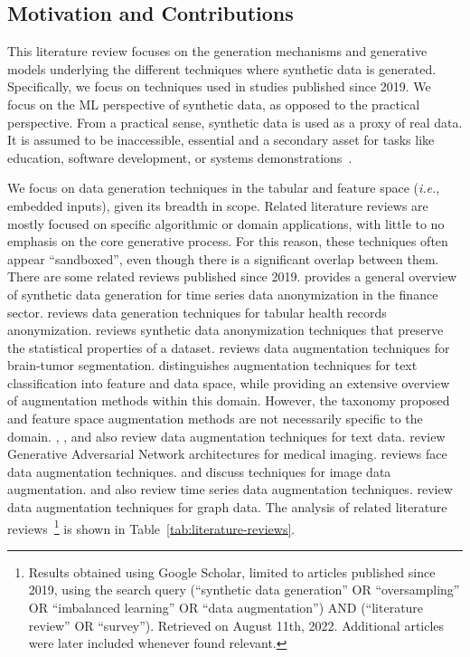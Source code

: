 \documentclass[parskip=full]{scrartcl}
\begin{document}

\subsection{Motivation and Contributions}

This literature review focuses on the generation mechanisms and generative
models underlying the different techniques where synthetic data is generated.
Specifically, we focus on techniques used in studies published since 2019. We
focus on the ML perspective of synthetic data, as opposed to the practical
perspective. From a practical sense, synthetic data is used as a proxy of real
data. It is assumed to be inaccessible, essential and a secondary asset for
tasks like education, software development, or systems
demonstrations~\cite{mannino2019real}. 

We focus on data generation techniques in the tabular and feature space
(\textit{i.e.}, embedded inputs), given its breadth in scope. Related
literature reviews are mostly focused on specific algorithmic or domain
applications, with little to no emphasis on the core generative process. For
this reason, these techniques often appear ``sandboxed'', even though there is
a significant overlap between them. There are some related reviews published
since 2019. \citet{assefa2020generating} provides a general overview of
synthetic data generation for time series data anonymization in the finance
sector. \citet{hernandez2022synthetic} reviews data generation techniques for
tabular health records anonymization. \citet{raghunathan2021synthetic} reviews
synthetic data anonymization techniques that preserve the statistical
properties of a dataset. \citet{nalepa2019data} reviews data augmentation
techniques for brain-tumor segmentation. \citet{bayer2021survey} distinguishes
augmentation techniques for text classification into feature and data space,
while providing an extensive overview of augmentation methods within this
domain. However, the taxonomy proposed and feature space augmentation methods
are not necessarily specific to the domain. \citet{shorten2021text},
\citet{chen2021empirical}, \citet{feng2021survey} and \citet{liu2020survey}
also review data augmentation techniques for text data.
\citet{yi2019generative} review Generative Adversarial Network architectures
for medical imaging. \citet{wang2020survey} reviews face data augmentation
techniques. \citet{shorten2019survey} and \citet{khosla2020enhancing} discuss
techniques for image data augmentation. \citet{iwana2021empirical} and
\citet{wen2020time} also review time series data augmentation techniques.
\citet{zhao2022graph} review data augmentation techniques for graph data. The
analysis of related literature reviews~\footnote{%
    Results obtained using Google Scholar, limited to articles published since
    2019, using the search query {\selectfont (``synthetic
    data generation'' OR ``oversampling'' OR ``imbalanced learning'' OR ``data
    augmentation'') AND (``literature review'' OR ``survey'')}. Retrieved on
    August 11th, 2022. Additional articles were later included whenever
    found relevant.
} is shown in Table~\ref{tab:literature-reviews}.
\end{document}
